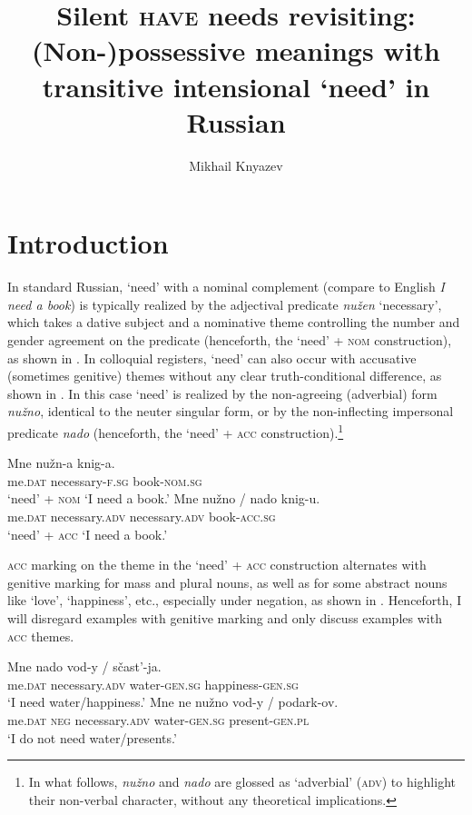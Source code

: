 \documentclass[output=paper,colorlinks,citecolor=brown]{langscibook}
\author{Mikhail Knyazev\affiliation{Institute for Linguistic Studies RAS, Saint Petersburg}\affiliation{National Research University Higher School of Economics, Saint Petersburg}\orcid{0000-0003-4652-4144}}
\title{Silent \textsc{have} needs revisiting: (Non-)possessive meanings with transitive intensional `need' in Russian}
\begin{document}
\maketitle

\section{Introduction}\label{section-intro}

In standard Russian, `need' with a nominal complement (compare to English \textit{I need a book}) is typically realized by the adjectival predicate \textit{nužen} `necessary', which takes a dative subject and a nominative theme controlling the number and gender agreement on the predicate (henceforth, the `need' + \textsc{nom} construction), as shown in . In colloquial registers, `need' can also occur with accusative (sometimes genitive) themes without any clear truth-conditional difference, as shown in . In this case `need' is realized by the non-agreeing (adverbial) form \textit{nužno}, identical to the neuter singular form, or by the non-inflecting impersonal predicate \textit{nado} (henceforth, the `need' + \textsc{acc} construction).\footnote{In what follows, \textit{nužno} and \textit{nado} are glossed as `adverbial' (\textsc{adv}) to highlight their non-verbal character, without any theoretical implications.}

\ea
\ea \gll Mne nužn-a knig-a.\\
     me.\textsc{dat} necessary-\textsc{f.sg} book-\textsc{nom.sg}\\ \hfill `need' + \textsc{nom}
\glt `I need a book.'\label{need-nom}
\ex \gll Mne nužno / nado knig-u.\\
     me.\textsc{dat} necessary.\textsc{adv} {} necessary.\textsc{adv} book-\textsc{acc.sg}\\ \hfill `need' + \textsc{acc}
\glt `I need a book.'\label{need-acc}
\z \z

\noindent \textsc{acc} marking on the theme in the `need' + \textsc{acc} construction alternates with genitive marking for mass and plural nouns, as well as for some abstract nouns like `love', `happiness', etc., especially under negation, as shown in . Henceforth, I will disregard examples with genitive marking and only discuss examples with \textsc{acc} themes.

\ea\label{need-gen}
\ea \gll Mne nado vod-y / sčast'-ja.\\
     me.\textsc{dat} necessary.\textsc{adv} water-\textsc{gen.sg} {} happiness-\textsc{gen.sg}\\
\glt `I need water/happiness.'
\ex \gll Mne ne nužno vod-y / podark-ov.\\
     me.\textsc{dat} \textsc{neg} necessary.\textsc{adv} water-\textsc{gen.sg}  {} present-\textsc{gen.pl}\\
\glt `I do not need water/presents.'
\z\z
\end{document}
